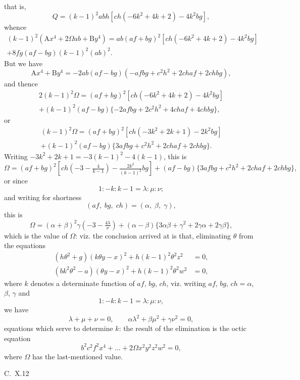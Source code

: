 \documentclass[12pt,a4paper]{article}
\theoremstyle{plain}
\begin{document}
\newpage
\setcounter{page}{109}

that is,
\[
Q = (k-1)^{2}abh[ch(-6k^{2} + 4k + 2) - 4k^{2}bg],
\]
whence
%
\begin{multline}
(k-1)^{2}(\text{A}x^{4} + 2\Omega ab + \text{B}y^{4}) = ab(af + bg)^{2}[ch(-6k^{2} + 4k + 2) - 4k^{2}bg] \\
+ 8fg(af - bg)(k-1)^{2}(ab)^{2}.
\end{multline}
%
But we have
\[
\text{A}x^{4} + \text{B}y^{4} = -2ab(af - bg)(-afbg + c^{2}h^{2} + 2chaf + 2chbg),
\]
and thence
%
\begin{multline}
2(k-1)^{2}\Omega = (af + bg)^{2}[ch(-6k^{2} + 4k + 2) - 4k^{2}bg] \\
+ (k-1)^{2}(af - bg)\{-2afbg + 2c^{2}h^{2} + 4chaf + 4chbg\},
\end{multline}
%
or
%
\begin{multline}
(k-1)^{2}\Omega = (af + bg)^{2}[ch(-3k^{2} + 2k + 1) - 2k^{2}bg] \\
+ (k-1)^{2}(af - bg)\{3afbg + c^{2}h^{2} + 2chaf + 2chbg\}.
\end{multline}
%
Writing $-3k^{2} + 2k + 1 = -3(k-1)^{2} - 4(k-1)$, this is
\[
\Omega = (af + bg)^{2}[ch(-3 - \tfrac{4}{k-1}) - \tfrac{2k^{2}}{(k-1)^{2}}bg] + (af - bg)\{3afbg + c^{2}h^{2} + 2chaf + 2chbg\},
\]
or since
\[
1 : -k : k-1 = \lambda : \mu : \nu;
\]
and writing for shortness
\[
(af,\; bg,\; ch) = (\alpha,\; \beta,\; \gamma),
\]
this is
\[
\Omega = (\alpha + \beta)^{2}\gamma(-3 - \tfrac{4\lambda}{\nu}) + (\alpha - \beta)\{3\alpha\beta + \gamma^{2} + 2\gamma\alpha + 2\gamma\beta\},
\]
which is the value of $\Omega$: viz. the conclusion arrived at is that, eliminating $\theta$ from the equations
\begin{align*}
(h\theta^{2} + g)(k\theta y - x)^{2} + h(k-1)^{2}\theta^{2}z^{2} &= 0, \\
(bk^{2}\theta^{2} - a)(\theta y - x)^{2} + h(k-1)^{2}\theta^{2}w^{2} &= 0,
\end{align*}
where $k$ denotes a determinate function of $af$, $bg$, $ch$, viz. writing $af$, $bg$, $ch = \alpha$, $\beta$, $\gamma$ and
\[
1 : -k : k-1 = \lambda : \mu : \nu,
\]
we have
\[
\lambda + \mu + \nu = 0, \qquad \alpha\lambda^{2} + \beta\mu^{2} + \gamma\nu^{2} = 0,
\]
equations which serve to determine $k$: the result of the elimination is the octic equation
\[
b^{2}c^{2}f^{2}x^{4} + \ldots + 2\Omega x^{2}y^{2}z^{2}w^{2} = 0,
\]
where $\Omega$ has the last-mentioned value.

\medskip\noindent\textsc{C.~X.}\hfill 12
\end{document}
